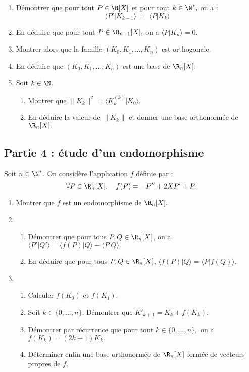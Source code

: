 \documentclass[twoside,french,11pt]{VcCours}
\begin{document}
\begin{enumerate}
  \item Démontrer que pour tout $P\in\R[X]$ et pour tout $k \in\N^*,$ on a :
	$$\langle P'|K_{k-1}\rangle  \ = \ \langle P|K_k\rangle  $$
	\item En déduire que pour tout $P\in\R_{n-1}[X],$ on a 
	$\langle P|K_n\rangle =0.$
	\item Montrer alors que la famille $(K_0,K_1,\dots,K_n)$ est orthogonale.
	\item En déduire que $(K_0,K_1,\dots,K_n)$ est une base de $\R_n[X].$
	\item Soit $k\in\N$.
	\begin{enumerate}
		\item Montrer que $\| K_k\|^2=\langle K_k^{(k)}| K_0\rangle .$
		\item En déduire la valeur de $\|K_k\|$ et donner une base orthonormée de $\R_n[X].$
	\end{enumerate}
\end{enumerate}

\subsection*{Partie 4 : étude d'un endomorphisme}

Soit $n\in\N^*.$ On considère l'application $f$ définie par :
$$\forall P\in\R_n[X],\quad f(P)=-P''+2XP'+P.$$

\begin{enumerate}
	\item Montrer que $f$ est un endomorphisme de $\R_n[X].$
	\item 
	\begin{enumerate}
	\item Démontrer que pour tous $P,Q\in\R_n[X]$, on a $\langle P'|Q'\rangle =\langle f(P)|Q\rangle -\langle P|Q\rangle .$
	\item En déduire que pour tous $P,Q\in\R_n[X]$, $\langle f(P)|Q\rangle  = \langle P|f(Q)\rangle $.
	\end{enumerate}
	\item 
	\begin{enumerate}
	\item Calculer $f(K_0)$ et $f(K_1).$
	\item Soit $k\in\{0,\dots, n\}$. Démontrer que $K'_{k+1}=K_k+f(K_k).$
	\item Démontrer par récurrence que pour tout $k\in\{0,\dots,n\},$ on a $f(K_k)=(2k+1)K_k.$
	\item Déterminer enfin une base orthonormée de $\R_n[X]$ formée de vecteurs propres de $f.$
	\end{enumerate}
\end{enumerate}
\end{document}
